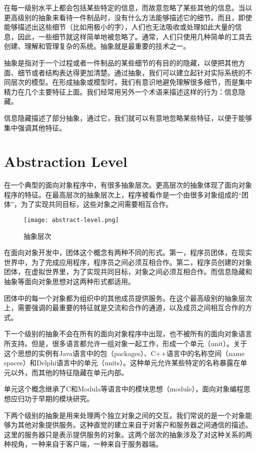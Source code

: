 在每一级别水平上都会包括某些特定的信息，而故意忽略了某些其他的信息。当以更高级别的抽象来看待一件制品时，没有什么方法能够描述它的细节。而且，即使能够描述出这些细节（比如用极小的字），人们也无法吸收或处理如此大量的信息，因此，一些细节就这样简单地被忽略了。通常，人们只使用几种简单的工具去创建、理解和管理复杂的系统。抽象就是最重要的技术之一。


抽象是指对于一个过程或者一件制品的某些细节的有目的的隐藏，以便把其他方面、细节或者结构表达得更加清楚。通过抽象，我们可以建立起针对实际系统的不同层次的模型。在形成抽象或模型时，我们有意识地避免理解很多细节，而是集中精力在几个主要特征上面。我们经常用另外一个术语来描述这样的行为：信息隐藏。


信息隐藏描述了部分抽象，通过它，我们就可以有意地忽略某些特征，以便于能够集中强调其他特征。


\section{Abstraction Level}


在一个典型的面向对象程序中，有很多抽象层次。更高层次的抽象体现了面向对象程序的特征。在最高层次的抽象层次上，程序被看作是一个由很多对象组成的“团体”，为了实现共同目标，这些对象之间需要相互合作。


\begin{figure}[htbp]
\centering
\texttt{[image: abstract-level.png]}
\caption{抽象层次}
\label{fig:abstract-level}
\end{figure}


在面向对象开发中，团体这个概念有两种不同的形式。第一，程序员团体，在现实世界中，为了完成应用程序，程序员之间必须互相合作。第二，程序员创建的对象团体，在虚拟世界里，为了实现共同目标，对象之间必须互相合作。而信息隐藏和抽象等面向对象思想对这两种形式都适用。

团体中的每一个对象都为组织中的其他成员提供服务。在这个最高级别的抽象层次上，需要强调的最重要的特征就是交流和合作的通道，以及成员之间相互合作的方式。

下一个级别的抽象不会在所有的面向对象程序中出现，也不被所有的面向对象语言所支持。但是，很多语言都允许一组对象一起工作，形成一个单元（unit）。关于这个思想的实例有Java语言中的包（packages）、C++语言中的名称空间（name spaces）和Delphi语言中的单元（units）。这种单元允许某些特定的名称暴露在单元以外，而其他的特征隐藏在单元内部。

单元这个概念继承了C和Modula等语言中的模块思想（module），面向对象编程思想应归功于早期的模块研究。

下两个级别的抽象是用来处理两个独立对象之间的交互。我们常说的是一个对象能够为其他对象提供服务。这种直觉的建立来自于对客户和服务器之间通信的描述。
这里的服务器只是表示提供服务的对象。这两个层次的抽象涉及了对这种关系的两种视角，一种来自于客户端，一种来自于服务器端。


